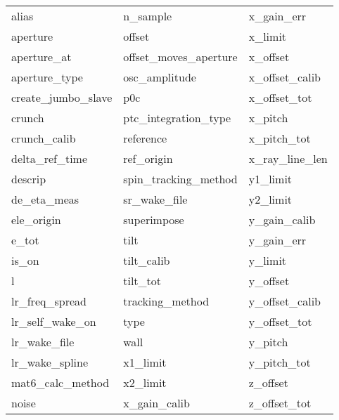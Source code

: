  \begin{tabular}{lll} \toprule
alias                       & n_sample                    & x_gain_err                  \\
aperture                    & offset                      & x_limit                     \\
aperture_at                 & offset_moves_aperture       & x_offset                    \\
aperture_type               & osc_amplitude               & x_offset_calib              \\
create_jumbo_slave          & p0c                         & x_offset_tot                \\
crunch                      & ptc_integration_type        & x_pitch                     \\
crunch_calib                & reference                   & x_pitch_tot                 \\
delta_ref_time              & ref_origin                  & x_ray_line_len              \\
descrip                     & spin_tracking_method        & y1_limit                    \\
de_eta_meas                 & sr_wake_file                & y2_limit                    \\
ele_origin                  & superimpose                 & y_gain_calib                \\
e_tot                       & tilt                        & y_gain_err                  \\
is_on                       & tilt_calib                  & y_limit                     \\
l                           & tilt_tot                    & y_offset                    \\
lr_freq_spread              & tracking_method             & y_offset_calib              \\
lr_self_wake_on             & type                        & y_offset_tot                \\
lr_wake_file                & wall                        & y_pitch                     \\
lr_wake_spline              & x1_limit                    & y_pitch_tot                 \\
mat6_calc_method            & x2_limit                    & z_offset                    \\
noise                       & x_gain_calib                & z_offset_tot                \\
 \bottomrule
 \end{tabular}
 \vfill
 
